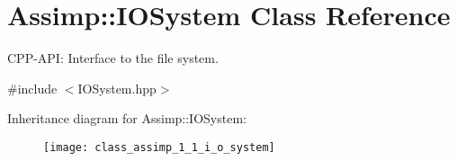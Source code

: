 \hypertarget{class_assimp_1_1_i_o_system}{}\section{Assimp\+:\+:I\+O\+System Class Reference}
\label{class_assimp_1_1_i_o_system}


C\+P\+P-\/\+A\+PI\+: Interface to the file system.  




{\ttfamily \#include $<$I\+O\+System.\+hpp$>$}

Inheritance diagram for Assimp\+:\+:I\+O\+System\+:\begin{figure}[H]
\begin{center}
\leavevmode
\texttt{[image: class\_assimp\_1\_1\_i\_o\_system]}
\end{center}
\end{figure}
